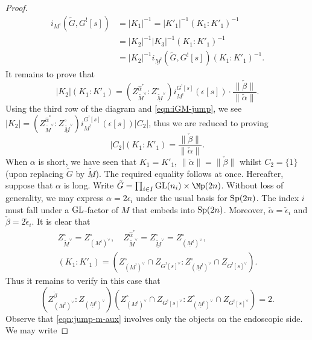 \documentclass[12pt, a3paper, openany]{book}
\begin{document}
\begin{proof}
\begin{align*}
		i_{M^!}(\tilde{G}, G^![s]) & = |K_1|^{-1} = |K'_1|^{-1} (K_1 : K'_1)^{-1} \\
		& = |K_2|^{-1} |K_3|^{-1} (K_1 : K'_1)^{-1} \\
		& = |K_2|^{-1} i_{\underline{M}^!}(\tilde{G}, G^![s]) (K_1 : K'_1)^{-1}.
	\end{align*}
	It remains to prove that
	\begin{equation*}
		|K_2| (K_1 : K'_1) = \left( Z_{\tilde{M}^\vee}^{\hat{\alpha}^*} : Z_{\underline{\tilde{M}}^\vee}^\circ \right)  i^{G^![s]}_{M^!}(\epsilon[s]) \cdot \frac{\|\check{\beta}\|}{\|\check{\alpha}\|} .
	\end{equation*}
	Using the third row of the diagram and \eqref{eqn:iGM-jump}, we see $|K_2| = \left( Z_{\tilde{M}^\vee}^{\hat{\alpha}^*} : Z_{\underline{\tilde{M}}^\vee}^\circ \right)  i^{G^![s]}_{M^!}(\epsilon[s]) |C_2|$, thus we are reduced to proving
	\begin{equation*}
		|C_2| (K_1 : K'_1) = \frac{\|\check{\beta}\|}{\|\check{\alpha}\|}.
	\end{equation*}
	When $\alpha$ is short, we have seen that $K_1 = K'_1$, $\|\check{\alpha}\| = \|\check{\beta}\|$ whilst $C_2 = \{1\}$ (upon replacing $\tilde{G}$ by $\underline{\tilde{M}}$). The required equality follows at once.
	Hereafter, suppose that $\alpha$ is long. Write $\tilde{G} = \prod_{i \in I} \GL(n_i) \times \Mp(2n)$. Without loss of generality, we may express $\alpha = 2\epsilon_i$ under the usual basis for $\operatorname{Sp}(2n)$. The index $i$ must fall under a $\operatorname{GL}$-factor of $M$ that embeds into $\operatorname{Sp}(2n)$. Moreover, $\check{\alpha} = \check{\epsilon}_i$ and $\check{\beta} = 2\check{\epsilon}_i$. It is clear that
	\begin{gather*}
		Z_{\tilde{M}^\vee}^\circ = Z_{(M^!)^\vee}^\circ , \quad Z_{\tilde{M}^\vee}^{\hat{\alpha}^*} = Z_{\underline{\tilde{M}}^\vee}^\circ = Z_{(\underline{M}^!)^\vee}^\circ, \\
		(K_1 : K'_1 ) = \left( Z_{(M^!)^\vee}^\circ \cap Z_{G^![s]^\vee} : Z_{(\underline{M}^!)^\vee}^\circ \cap Z_{G^![s]^\vee} \right).
	\end{gather*}
	Thus it remains to verify in this case that
	\begin{equation}\label{eqn:jump-m-aux}
		\left( Z_{(M^!)^\vee}^{\check{\beta}} : Z_{(\underline{M}^!)^\vee} \right) \left( Z_{(M^!)^\vee}^\circ \cap Z_{G^![s]^\vee} : Z_{(\underline{M}^!)^\vee}^\circ \cap Z_{G^![s]^\vee} \right) = 2.
	\end{equation}
	Observe that \eqref{eqn:jump-m-aux} involves only the objects on the endoscopic side. We may write

\end{proof}
\end{document}
